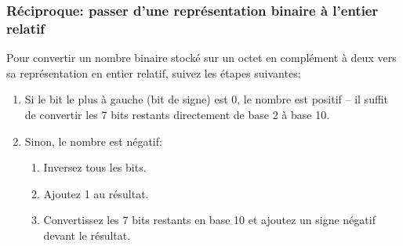 \documentclass[12pt]{article}
\begin{document}
	\subsubsection*{Réciproque: passer d'une représentation binaire à l'entier relatif}
	
	Pour convertir un nombre binaire stocké sur un octet en complément à deux vers sa représentation en entier relatif, suivez les étapes suivantes:
	\begin{enumerate}
		\item Si le bit le plus à gauche (bit de signe) est 0, le nombre est positif -- il suffit de  convertir les 7 bits restants directement de base 2 à base 10.
		\item Sinon, le nombre est négatif:
		\begin{enumerate}
			\item Inversez tous les bits.
			\item Ajoutez 1 au résultat.
			\item Convertissez les 7 bits restants en base 10 et ajoutez un signe négatif devant le résultat.
		\end{enumerate}
	\end{enumerate}
	
\end{document}
